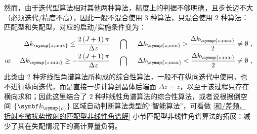 然而，由于迭代型算法相对其他两种算法，精度上的判据不够明确，且步长迈不大（必须迭代/精度不高），因此一般不混合使用 3 种算法，只混合使用 2 种算法：匹配型和失配型，对应的启动/实施条件变为：
\begin{subequations} \label{eq:2-298}
	\abovedisplayskip=13pt
	\belowdisplayskip=13pt
	\begin{align}
		\Delta k_{\symup{z;\max}} \leq \frac{2 \left( J+1 \right) \pi}{\Delta z} \ \ \ \ &\bigcap\ \ \ \ \Delta k_{\symup{z;\min}} > \frac{ \Delta k_{\symup{z;\max}} }{ 2 } \neq \emptyset \label{eq:2-298a}~, \\ \text{or}\ \ \ \ \Delta k_{\symup{z;\min}} \geq - \frac{2 \left( J+1 \right) \pi}{\Delta z} \ \ \ \ &\bigcap\ \ \ \ \Delta k_{\symup{z;\max}} < \frac{ \Delta k_{\symup{z;\min}} }{ 2 } \neq \emptyset \label{eq:2-298b}~,
	\end{align}
\end{subequations}
此类由 2 种非线性角谱算法所构成的综合性算法，一般不在纵向迭代中使用，也不进行纵向迭代，而是直接一步计算到晶体后端面 $\Delta z = z$，以至于该过程只存在横向求和；因此这里结合了 2 种非线性角谱算法的综合性算法，或者说根据倒空间 $\{ \symbf k_{\symup{\rho}} \}$ 区域自动判断算法类型的“智能算法”，可看做 \ref{和/差频、折射率微扰势散射的匹配型非线性角谱解} 小节匹配型非线性角谱算法的拓展：减少了其在失配情况下的高计算量负荷。


